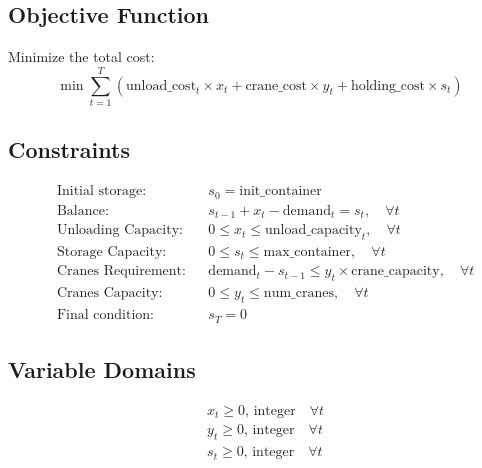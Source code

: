 \documentclass{article}
\begin{document}
\subsection*{Objective Function}
Minimize the total cost:
\[
\min \sum_{t=1}^{T} \left( \text{unload\_cost}_t \times x_t + \text{crane\_cost} \times y_t + \text{holding\_cost} \times s_t \right)
\]

\subsection*{Constraints}
\begin{align}
    &\text{Initial storage:} && s_0 = \text{init\_container} \\
    &\text{Balance:} && s_{t-1} + x_t - \text{demand}_t = s_t, \quad \forall t \\
    &\text{Unloading Capacity:} && 0 \leq x_t \leq \text{unload\_capacity}_t, \quad \forall t \\
    &\text{Storage Capacity:} && 0 \leq s_t \leq \text{max\_container}, \quad \forall t \\
    &\text{Cranes Requirement:} && \text{demand}_t - s_{t-1} \leq y_t \times \text{crane\_capacity}, \quad \forall t \\
    &\text{Cranes Capacity:} && 0 \leq y_t \leq \text{num\_cranes}, \quad \forall t \\
    &\text{Final condition:} && s_T = 0
\end{align}

\subsection*{Variable Domains}
\begin{align}
    & x_t \geq 0, \, \text{integer} \quad \forall t \\
    & y_t \geq 0, \, \text{integer} \quad \forall t \\
    & s_t \geq 0, \, \text{integer} \quad \forall t
\end{align}
\end{document}
